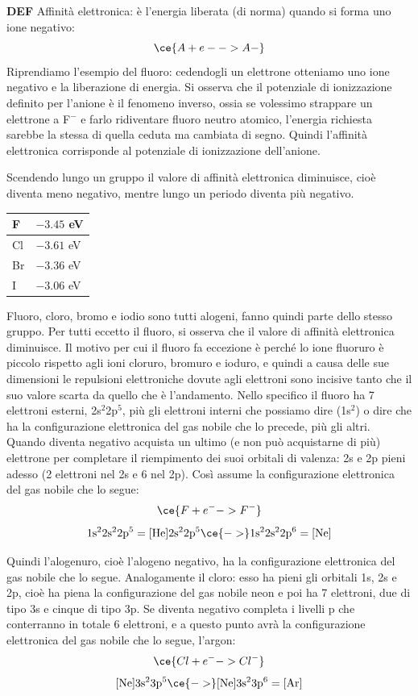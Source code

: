 \textbf{DEF} Affinità elettronica: è l'energia liberata (di norma) quando si forma uno ione negativo:
$$\ce{ A + e- -> A-}$$ 
Riprendiamo l'esempio del fluoro: cedendogli un elettrone otteniamo uno ione negativo e la liberazione di energia. Si osserva che il potenziale di ionizzazione definito per l'anione è il fenomeno inverso, ossia se volessimo strappare un elettrone a F$^-$ e farlo ridiventare fluoro neutro atomico, l'energia richiesta sarebbe la stessa di quella ceduta ma cambiata di segno. Quindi l'affinità elettronica corrisponde al potenziale di ionizzazione dell'anione.

Scendendo lungo un gruppo il valore di affinità elettronica diminuisce, cioè diventa meno negativo, mentre lungo un periodo diventa più negativo.
\begin{center}
    \begin{tabular}{ m{1cm}|m{2cm} } 
        F & $-3.45$ eV \\
        \hline
        Cl & $-3.61$ eV \\
        \hline
        Br & $-3.36$ eV \\
        \hline
        I & $-3.06$ eV \\
        \hline
    \end{tabular}
\end{center}
Fluoro, cloro, bromo e iodio sono tutti alogeni, fanno quindi parte dello stesso gruppo. Per tutti eccetto il fluoro, si osserva che il valore di affinità elettronica diminuisce. Il motivo per cui il fluoro fa eccezione è perché lo ione fluoruro è piccolo rispetto agli ioni cloruro, bromuro e ioduro, e quindi a causa delle sue dimensioni le repulsioni elettroniche dovute agli elettroni sono incisive tanto che il suo valore scarta da quello che è l'andamento. Nello specifico il fluoro ha 7 elettroni esterni, 2s$^2$2p$^5$, più gli elettroni interni che possiamo dire (1s$^2$) o dire che ha la configurazione elettronica del gas nobile che lo precede, più gli altri. Quando diventa negativo acquista un ultimo (e non può acquistarne di più) elettrone per completare il riempimento dei suoi orbitali di valenza: 2s e 2p pieni adesso (2 elettroni nel 2s e 6 nel 2p). Così assume la configurazione elettronica del gas nobile che lo segue:
$$\ce{F + e^- -> F^-}$$
$$\rm 1s^22s^22p^5= [He]2s^22p^5\ce{->}1s^22s^22p^6=[Ne]$$

Quindi l'alogenuro, cioè l'alogeno negativo, ha la configurazione elettronica del gas nobile che lo segue. Analogamente il cloro: esso ha pieni gli orbitali 1s, 2s e 2p, cioè ha piena la configurazione del gas nobile neon e poi ha 7 elettroni, due di tipo 3s e cinque di tipo 3p. Se diventa negativo completa i livelli p che conterranno in totale 6 elettroni, e a questo punto avrà la configurazione elettronica del gas nobile che lo segue, l'argon:
$$\ce{Cl + e^- -> Cl^-}$$
$$\rm [Ne]3s^23p^5 \ce{->} [Ne]3s^23p^6=[Ar]$$

